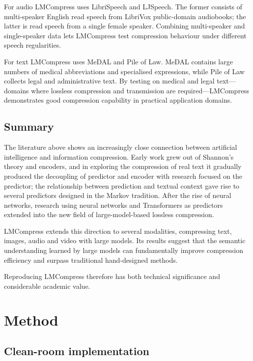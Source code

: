 \documentclass[12pt,a4paper]{article}
\begin{document}
For audio LMCompress uses LibriSpeech and LJSpeech. The former consists of multi-speaker
English read speech from LibriVox public-domain audiobooks; the latter is read speech from a
single female speaker. Combining multi-speaker and single-speaker data lets LMCompress test
compression behaviour under different speech regularities.

For text LMCompress uses MeDAL and Pile of Law. MeDAL contains large numbers of medical
abbreviations and specialised expressions, while Pile of Law collects legal and administrative
text. By testing on medical and legal text---domains where lossless compression and
transmission are required---LMCompress demonstrates good compression capability in practical
application domains.

\subsection{Summary}

The literature above shows an increasingly close connection between artificial intelligence
and information compression. Early work grew out of Shannon's theory and encoders, and in
exploring the compression of real text it gradually produced the decoupling of predictor and
encoder with research focused on the predictor; the relationship between prediction and
textual context gave rise to several predictors designed in the Markov tradition. After the
rise of neural networks, research using neural networks and Transformers as predictors
extended into the new field of large-model-based lossless compression.

LMCompress extends this direction to several modalities, compressing text, images, audio and
video with large models. Its results suggest that the semantic understanding learned by large
models can fundamentally improve compression efficiency and surpass traditional hand-designed
methods.

Reproducing LMCompress therefore has both technical significance and considerable academic
value.

\section{Method}

\subsection{Clean-room implementation}
\end{document}
